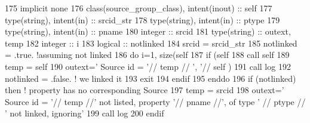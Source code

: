 \begin{DoxyCode}
175     \textcolor{keywordtype}{implicit none}
176     \textcolor{keywordtype}{class}(source\_group\_class), \textcolor{keywordtype}{intent(inout)} :: self
177     \textcolor{keywordtype}{type}(string), \textcolor{keywordtype}{intent(in)} :: srcid\_str
178     \textcolor{keywordtype}{type}(string), \textcolor{keywordtype}{intent(in)} :: ptype
179     \textcolor{keywordtype}{type}(string), \textcolor{keywordtype}{intent(in)} :: pname
180     \textcolor{keywordtype}{integer} :: srcid
181     \textcolor{keywordtype}{type}(string) :: outext, temp
182     \textcolor{keywordtype}{integer} :: i
183     \textcolor{keywordtype}{logical} :: notlinked
184     srcid = srcid\_str%
185     notlinked = .true.  \textcolor{comment}{!assuming not linked}
186     \textcolor{keywordflow}{do} i=1, \textcolor{keyword}{size}(self%
187         \textcolor{keywordflow}{if} (self%
188             \textcolor{keyword}{call }self%
189             temp = self%
190             outext=\textcolor{stringliteral}{'      Source id = '}// temp // \textcolor{stringliteral}{', '}// self%
      )%
191             \textcolor{keyword}{call }log%
192             notlinked = .false. \textcolor{comment}{! we linked it}
193             \textcolor{keywordflow}{exit}
194 \textcolor{keywordflow}{        endif}
195 \textcolor{keywordflow}{    enddo}
196     \textcolor{keywordflow}{if} (notlinked) \textcolor{keywordflow}{then} \textcolor{comment}{! property has no corresponding Source}
197         temp = srcid
198         outext=\textcolor{stringliteral}{'      Source id = '}// temp //\textcolor{stringliteral}{' not listed, property '}// pname //\textcolor{stringliteral}{', of type '} // ptype // \textcolor{stringliteral}{'
       not linked, ignoring'}
199         \textcolor{keyword}{call }log%
200 \textcolor{keywordflow}{    endif}
\end{DoxyCode}
\mbox{\label{namespacesources__mod_af7fab14b56573184d5ca4371409118b0}} 
